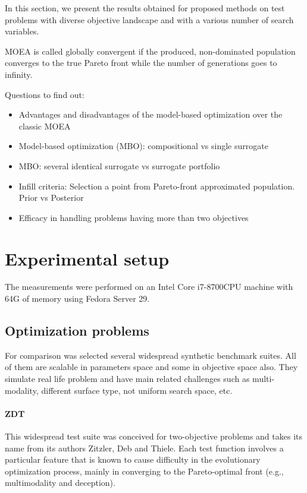 In this section, we present the results obtained for proposed methods on test problems with diverse objective landscape and with a various number of search variables.

MOEA is called globally convergent if the produced, non-dominated population converges to the true Pareto front while the number of generations goes to infinity.

Questions to find out:
\begin{itemize}
    \item Advantages and disadvantages of the model-based optimization over the classic MOEA
    \item Model-based optimization (MBO): compositional vs single surrogate 
    \item MBO: several identical surrogate vs surrogate portfolio
    \item Infill criteria: Selection a point from Pareto-front approximated population. Prior vs Posterior
    \item Efficacy in handling problems having more than two objectives
\end{itemize}



\cite{kouwe2018benchmarking}

\section{Experimental setup}
The measurements were performed on an Intel Core i7-8700CPU machine with 64G of memory using Fedora Server 29.

\subsection{Optimization problems}
For comparison was selected several widespread synthetic benchmark suites. All of them are scalable in parameters space and some in objective space also. They simulate real life problem and have main related challenges such as multi-modality, different surface type, not uniform search space, etc.

    \paragraph{ZDT}
    This widespread test suite\cite{ZitzlerDT00} was conceived for two-objective problems and takes its name from its authors Zitzler, Deb and Thiele. Each test function involves a particular feature that is known to cause difficulty in the evolutionary optimization process, mainly in converging to the Pareto-optimal front (e.g., multimodality and deception).

